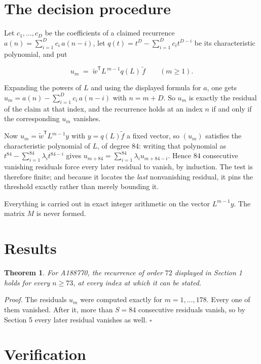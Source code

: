 \documentclass[11pt]{article}
\newtheorem{theorem}{Theorem}
\theoremstyle{definition}
\begin{document}
\section{The decision procedure}

Let $c_1,\dots,c_D$ be the coefficients of a claimed recurrence $a(n) = \sum_{i=1}^{D} c_i\,a(n-i)$, let $q(t) = t^{D} - \sum_{i=1}^{D} c_i t^{D-i}$ be its characteristic polynomial, and put

\[u_m \;=\; \tilde w^{\mathsf T} L^{\,m-1} q(L)\,\tilde f \qquad (m \ge 1).\]

Expanding the powers of $L$ and using the displayed formula for $a$, one gets $u_m = a(n) - \sum_{i=1}^{D} c_i\,a(n-i)$ with $n = m + D$. So $u_m$ is exactly the residual of the claim at that index, and the recurrence holds at an index $n$ if and only if the corresponding $u_m$ vanishes.

Now $u_m = \tilde w^{\mathsf T} L^{m-1} y$ with $y = q(L)\tilde f$ a fixed vector, so $(u_m)$ satisfies the characteristic polynomial of $L$, of degree $84$: writing that polynomial as $t^{84} - \sum_{i=1}^{84} \lambda_i t^{84-i}$ gives $u_{m+84} = \sum_{i=1}^{84} \lambda_i u_{m+84-i}$. Hence $84$ consecutive vanishing residuals force every later residual to vanish, by induction. The test is therefore finite; and because it locates the {\itshape last} nonvanishing residual, it pins the threshold exactly rather than merely bounding it.

Everything is carried out in exact integer arithmetic on the vector $L^{m-1}y$. The matrix $M$ is never formed.

\section{Results}

\begin{theorem} For A188770, the recurrence of order $72$ displayed in Section 1 holds for every $n \ge 73$, at every index at which it can be stated.\end{theorem}

{\itshape Proof.} The residuals $u_m$ were computed exactly for $m = 1,\dots,178$. Every one of them vanished. After it, more than $S = 84$ consecutive residuals vanish, so by Section 5 every later residual vanishes as well. $\square$

\section{Verification}
\end{document}
